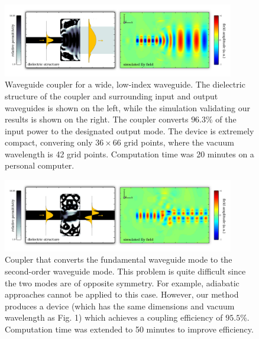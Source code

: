 \documentclass[letterpaper,10pt]{article}
\begin{document}
\begin{figure}[htbp]
    \centering
    \includegraphics[width=0.9\textwidth]{fig/fiber.jpg}
    \caption{Waveguide coupler for a wide, low-index waveguide. 
        The dielectric structure of the coupler and surrounding input and
        output waveguides is shown on the left, while the simulation
        validating our results is shown on the right.
        The coupler converts $96.3\%$ of the input power to the
        designated output mode.
        The device is extremely compact, 
        convering only $36 \times 66$ grid points,
        where the vacuum wavelength is 42 grid points.
        Computation time was 20 minutes on a personal computer.}
\end{figure}
\begin{figure}[htbp]
    \centering
    \includegraphics[width=0.9\textwidth]{fig/mode-conv.jpg}
    \caption{Coupler that converts the fundamental waveguide mode to the
        second-order waveguide mode.
        This problem is quite difficult since the two modes are of 
        opposite symmetry.
        For example, adiabatic approaches cannot be applied to this case.
        However, our method produces a device 
        (which has the same dimensions and vacuum wavelength as Fig. 1) 
        which achieves a coupling efficiency of $95.5\%$. 
        Computation time was extended to 50 minutes to improve efficiency.
        }
\end{figure}
\end{document}
